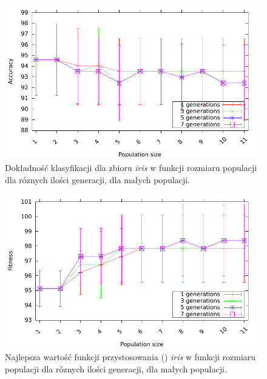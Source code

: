 	\begin{figure}
		\includegraphics[scale=0.90]{figures/accuracy/accuracy-iris-detailed}
		\caption{Dokładność klasyfikacji dla zbioru \emph{iris} w funkcji rozmiaru populacji dla róznych ilości generacji, dla małych populacji.	\label{fig:acc-iris-detailed}}
	\end{figure}	
	
	
	\begin{figure}
		\includegraphics[scale=0.90]{figures/accuracy/fitness-iris-detailed}
		\caption{Najlepsza wartość funkcji przystosowania ()  \emph{iris} w funkcji rozmiaru populacji dla róznych ilości generacji, dla małych populacji.	\label{fig:fit-iris-detailed}}
	\end{figure}	
	
